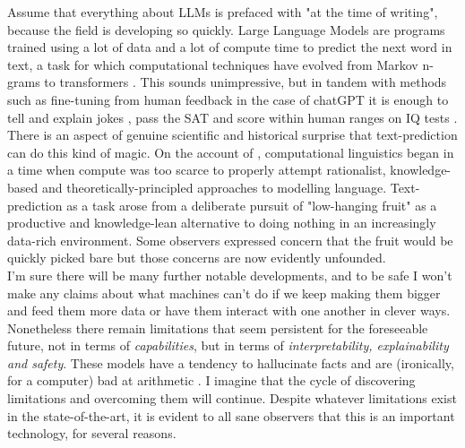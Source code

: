  Assume that everything about LLMs is prefaced with "at the time of writing", because the field is developing so quickly. Large Language Models are programs trained using a lot of data and a lot of compute time to predict the next word in text, a task for which computational techniques have evolved from Markov n-grams to transformers \citep{vaswaniAttentionAllYou2017}. This sounds unimpressive, but in tandem with methods such as fine-tuning from human feedback in the case of chatGPT \citep{openaiChatGPTOptimizingLanguage2022} it is enough to tell and explain jokes \citep{bastianGooglePaLMGiant2022}, pass the SAT \citep{teddy[@teddynpc]MadeChatGPTTake2022} and score within human ranges on IQ tests \citep{thompsonGPT3IQTesting2022}. There is an aspect of genuine scientific and historical surprise that text-prediction can do this kind of magic. On the account of \citep{mcshaneLinguisticsAgeAI2021}, computational linguistics began in a time when compute was too scarce to properly attempt rationalist, knowledge-based and theoretically-principled approaches to modelling language. Text-prediction as a task arose from a deliberate pursuit of "low-hanging fruit" as a productive and knowledge-lean alternative to doing nothing in an increasingly data-rich environment. Some observers \citep{churchPendulumSwungToo2011} expressed concern that the fruit would be quickly picked bare but those concerns are now evidently unfounded.\\

I'm sure there will be many further notable developments, and to be safe I won't make any claims about what machines can't do if we keep making them bigger and feed them more data or have them interact with one another in clever ways. Nonetheless there remain limitations that seem persistent for the foreseeable future, not in terms of \emph{capabilities}, but in terms of \emph{interpretability, explainability and safety}. These models have a tendency to hallucinate facts and are (ironically, for a computer) bad at arithmetic \citep{hendrycksMeasuringMathematicalProblem2021}. I imagine that the cycle of discovering limitations and overcoming them will continue. Despite whatever limitations exist in the state-of-the-art, it is evident to all sane observers that this is an important technology, for several reasons.

